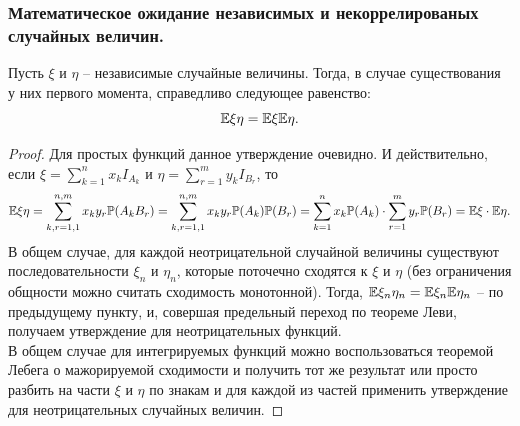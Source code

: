 \subsubsection{Математическое ожидание независимых и некоррелированых случайных величин.}
\begin{theorem}
    Пусть $\xi$ и $\eta$ -- независимые случайные величины.
    Тогда, в случае существования у них первого момента, справедливо следующее равенство:
    \[
        \mathbb{E} \xi \eta = \mathbb{E} \xi \mathbb{E} \eta.
    \]
\end{theorem}
\begin{proof}
    Для простых функций данное утверждение очевидно.
    И действительно, если $\xi = \sum\limits_{k = 1}^{n} x_k I_{A_k}$ и $\eta = \sum\limits_{r = 1}^{m} y_k I_{B_r}$, то
    \[
        \mathbb{E} \xi \eta = \sum\limits_{k, r = 1, 1}^{n, m} x_k y_r \mathbb{P}(A_k B_r) = \sum\limits_{k, r = 1, 1}^{n, m} x_k y_r \mathbb{P}(A_k) \mathbb{P}(B_r) = \sum\limits_{k = 1}^n x_k \mathbb{P}(A_k) \cdot \sum\limits_{r = 1}^m y_r \mathbb{P}(B_r) = \mathbb{E} \xi \cdot \mathbb{E} \eta.
    \]
    В общем случае, для каждой неотрицательной случайной величины существуют последовательности $\xi_n$ и $\eta_n$, которые поточечно сходятся к $\xi$ и $\eta$ (без ограничения общности можно считать сходимость монотонной).
    Тогда, $\mathbb{E} \xi_n \eta_n =  \mathbb{E} \xi_n \mathbb{E} \eta_n$ -- по предыдущему пункту, и, совершая предельный переход по теореме Леви, получаем утверждение для неотрицательных функций. \\
    В общем случае для интегрируемых функций можно воспользоваться теоремой Лебега о мажорируемой сходимости и получить тот же результат или просто разбить на части $\xi$ и $\eta$ по знакам и для каждой из частей применить утверждение для неотрицательных случайных величин.
\end{proof}
